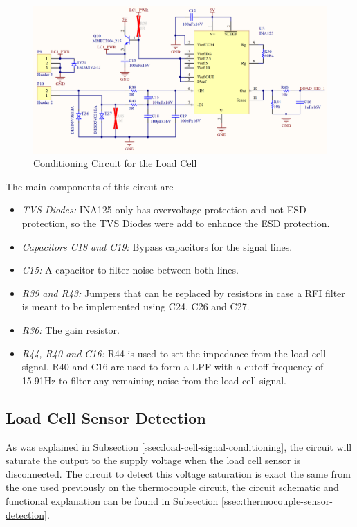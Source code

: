	\begin{figure}[htbp]
		\centering
		\includegraphics[width=1\textwidth]{figuras/fig-cic-cell}
		\caption{Conditioning Circuit for the Load Cell}
		\label{fig:cic-cell}
	\end{figure}

	The main components of this circut are
	\begin{itemize}
		\item\textit{TVS Diodes:} INA125 only has overvoltage protection and not ESD protection, so the TVS Diodes were add to enhance the ESD protection.
		\item\textit{Capacitors C18 and C19:} Bypass capacitors for the signal lines.
		\item\textit{C15:} A capacitor to filter noise between both lines.
		\item\textit{R39 and R43:} Jumpers that can be replaced by resistors in case a RFI filter is meant to be implemented using C24, C26 and C27.
		\item\textit{R36:} The gain resistor.
		\item\textit{R44, R40 and C16:} R44 is used to set the impedance from the load cell signal. R40 and C16 are used to form a LPF with a cutoff frequency of 15.91Hz to filter any remaining noise from the load cell signal.
	\end{itemize}

\subsection{Load Cell Sensor Detection}\label{ssec:load-cell-sensor-detection}
	As was explained in Subsection \ref{ssec:load-cell-signal-conditioning}, the circuit will saturate the output to the supply voltage when the load cell sensor is disconnected. The circuit to detect this voltage saturation is exact the same from the one used previously on the thermocouple circuit, the circuit schematic and functional explanation can be found in Subsection \ref{ssec:thermocouple-sensor-detection}.